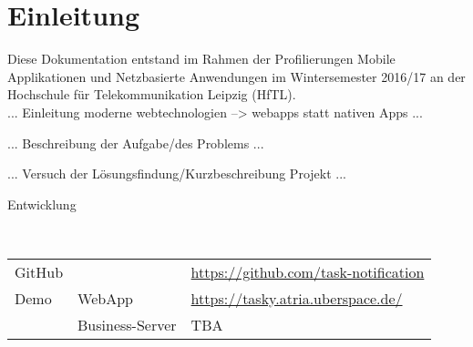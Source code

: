 \section{Einleitung}

Diese Dokumentation entstand im Rahmen der Profilierungen  \glqq{}Mobile Applikationen\grqq{} und \glqq{}Netzbasierte Anwendungen\grqq{} im Wintersemester 2016/17 an der Hochschule für Telekommunikation Leipzig (HfTL). \\


... Einleitung moderne webtechnologien --> webapps statt nativen Apps ... 

... Beschreibung der Aufgabe/des Problems ...

... Versuch der Lösungsfindung/Kurzbeschreibung Projekt ...
\\

\begin{Large}
Entwicklung
\end{Large} \\

\begin{tabular}{ l l l }
  GitHub & & \href{https://github.com/task-notification}{https://github.com/task-notification}  \\
  Demo & WebApp & \href{https://tasky.atria.uberspace.de}{https://tasky.atria.uberspace.de/} \\
   & Business-Server & TBA \\
\end{tabular}